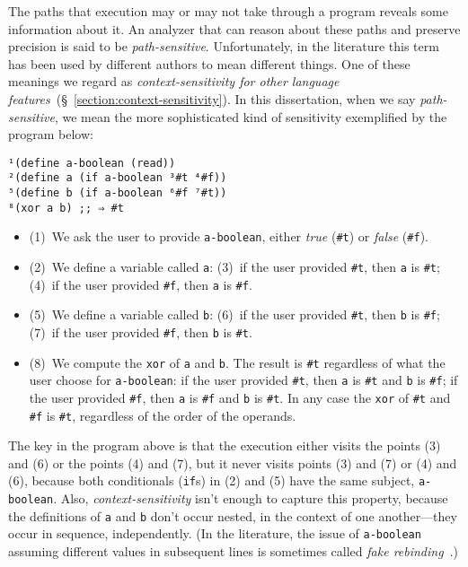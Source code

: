 \documentclass[12pt, oneside]{book}
\begin{document}
The paths that execution may or may not take through a program reveals some information about it. An analyzer that can reason about these paths and preserve precision is said to be \emph{path-sensitive}. Unfortunately, in the literature this term has been used by different authors to mean different things. One of these meanings we regard as \emph{context-sensitivity for other language features}~(§~\ref{section:context-sensitivity}). In this dissertation, when we say \emph{path-sensitive}, we mean the more sophisticated kind of sensitivity exemplified by the program below:

\begin{Verbatim}
¹(define a-boolean (read))
²(define a (if a-boolean ³#t ⁴#f))
⁵(define b (if a-boolean ⁶#f ⁷#t))
⁸(xor a b) ;; ⇒ #t
\end{Verbatim}

\begin{itemize}
  \item (1)~We ask the user to provide \texttt{a-boolean}, either \emph{true} (\texttt{\#t}) or \emph{false} (\texttt{\#f}).
  \item (2)~We define a variable called \texttt{a}: (3)~if the user provided \texttt{\#t}, then \texttt{a} is \texttt{\#t}; (4)~if the user provided \texttt{\#f}, then \texttt{a} is \texttt{\#f}.
  \item (5)~We define a variable called \texttt{b}: (6)~if the user provided \texttt{\#t}, then \texttt{b} is \texttt{\#f}; (7)~if the user provided \texttt{\#f}, then \texttt{b} is \texttt{\#t}.
  \item (8)~We compute the \texttt{xor} of \texttt{a} and \texttt{b}. The result is \texttt{\#t} regardless of what the user choose for \texttt{a-boolean}: if the user provided \texttt{\#t}, then \texttt{a} is \texttt{\#t} and \texttt{b} is \texttt{\#f}; if the user provided \texttt{\#f}, then \texttt{a} is \texttt{\#f} and \texttt{b} is \texttt{\#t}. In any case the \texttt{xor} of \texttt{\#t} and \texttt{\#f} is \texttt{\#t}, regardless of the order of the operands.
\end{itemize}

The key in the program above is that the execution either visits the points (3) and (6) or the points (4) and (7), but it never visits points (3) and (7) or (4) and (6), because both conditionals (\texttt{if}s) in (2) and (5) have the same subject, \texttt{a-boolean}. Also, \emph{context-sensitivity} isn’t enough to capture this property, because the definitions of \texttt{a} and \texttt{b} don’t occur nested, in the context of one another—they occur in sequence, independently. (In the literature, the issue of \texttt{a-boolean} assuming different values in subsequent lines is sometimes called \emph{fake rebinding}~\cite[§~3.3.4]{cfa2}.)
\end{document}
